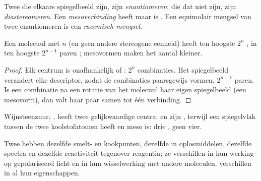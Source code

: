 \begin{definition}\label{def:b1:stereochemistry-in-depth:enantiomers}
Twee  die elkaars spiegelbeeld zijn, zijn
\emph{enantiomeren};  die dat niet
zijn, zijn \emph{diastereomeren}. Een
\emph{mesoverbinding} heeft  maar
is . Een equimolair mengsel van twee enantiomeren is een
\emph{racemisch mengsel}.
\end{definition}

\begin{proposition}\label{prop:b1:stereochemistry-in-depth:max-stereoisomers}
Een molecuul met $n$  (en geen andere stereogene
eenheid) heeft ten hoogste $2^n$ , in ten hoogste
$2^{n-1}$ paren ; mesovormen maken het aantal kleiner.
\end{proposition}

\begin{proof}
Elk centrum is onafhankelijk  of : $2^n$ combinaties. Het
spiegelbeeld verandert elke descriptor, zodat de combinaties paarsgewijs
 vormen, $2^{n-1}$ paren. Is een combinatie na een rotatie
van het molecuul haar eigen spiegelbeeld (een mesovorm), dan valt haar
paar samen tot één verbinding.
\end{proof}

Wijnsteenzuur, , heeft twee gelijkwaardige
centra:  en  zijn , terwijl  een
spiegelvlak tussen de twee koolstofatomen heeft en meso is: drie
, geen vier.

\begin{proposition}\label{prop:b1:stereochemistry-in-depth:enantiomer-properties}
Twee  hebben dezelfde smelt- en kookpunten, dezelfde
 in  oplosmiddelen, dezelfde spectra en dezelfde
reactiviteit tegenover  reagentia; ze verschillen in hun werking
op gepolariseerd licht en in hun wisselwerking met andere 
moleculen.  verschillen in al hun eigenschappen.
\end{proposition}

